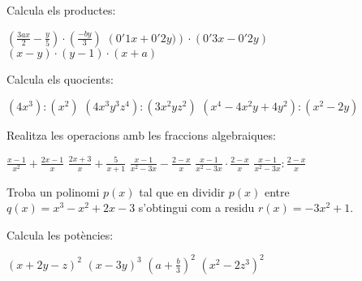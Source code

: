 \begin{activitats}
\begin{mylist}
\pagebreak
\exer  Calcula els productes:

\begin{tasks}
	\task  $\left(\frac{3ax}{2} -\frac{y}{5} \right)\cdot \left(\frac{-by}{3} \right)$  
	\task  $\left(0'1x+0'2y)\right)\cdot \left(0'3x-0'2y\right)$  
	\task  $\left(x-y\right)\cdot \left(y-1\right)\cdot \left(x+a\right)$
\end{tasks}


\exer  Calcula els quocients: 
\begin{tasks}
	\task  $(4x^{3} ):(x^{2} )$ 
	\task  $\left(4x^{3} y^{3} z^{4} \right):\left(3x^{2} yz^{2} \right)$  
	\task  $\left(x^{4} -4x^{2} y+4y^{2} \right):\left(x^{2} -2y\right)$
\end{tasks}

\answers[cols=2]{[$4x$, $\frac{4}{3}xy^2 z^2$, $x^2-2y$]}

\exer  Realitza les operacions amb les fraccions algebraiques:  

\begin{tasks}
	\task  $\frac{x-1}{x^{2} } +\frac{2x-1}{x} $  
	\task  $\frac{2x+3}{x} +\frac{5}{x+1} $  
	\task $\frac{x-1}{x^{2} -3x} -\frac{2-x}{x} $
	\task $\frac{x-1}{x^{2} -3x} \cdot \frac{2-x}{x} $  
	\task $\frac{x-1}{x^{2} -3x} :\frac{2-x}{x} $
\end{tasks}


\exer  Troba un polinomi $p(x)$ tal que en dividir $p(x)$ entre $q(x)=x^{3} -x^{2} +2x-3$ s'obtingui com a residu $r(x)=-3x^{2} +1$.  



\exer  Calcula les potències: 
\begin{tasks}
	\task  $(x+2y-z)^{2} $  
	\task  $(x-3y)^{3} $  
	\task  $\left(\left. a+\frac{b}{3} \right)\right. ^{2} $  
	\task  $(x^{2} -2z^{3} )^{2} $
\end{tasks}




\end{mylist}
\end{activitats}
